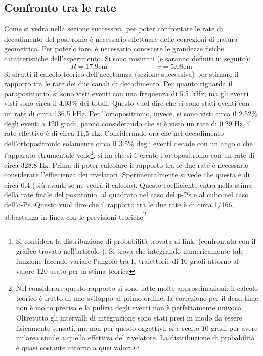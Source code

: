 \subsection{Confronto tra le rate}
Come si vedrà nella sezione successiva, per poter confrontare le rate di decadimento del positronio è necessario effettuare delle correzioni di natura geometrica. Per poterlo
fare, è necessario conoscere le grandezze fisiche caratteristiche dell'esperimento. Si sono misurati (e saranno definiti in seguito):
$$R = 17.9 \text{cm} \hspace{3cm} r =5.08 \text{cm}$$
Si sfrutti il calcolo teorico dell'accettanza (sezione successiva) per stimare il rapporto tra le rate dei due canali di decadimento. Per quanto riguarda il parapositronio, si sono visti eventi con una frequenza di 5.5~kHz, ma gli eventi visti sono circa il 4.03\% dei totali. Questo vuol dire che 
ci sono stati eventi con un rate di circa 136.5 kHz. Per l'ortopositronio, invece, si sono visti circa il 2.52\% degli eventi a 120 gradi,
perciò considerando che si è visto un rate
di 0.29 Hz, il rate effettivo è di circa 11,5 Hz. Considerando ora che nel decadimento dell'ortopositronio solamente circa il 3.5\% degli eventi decade con un
angolo che l'apparato strumentale vede\footnote{Si considera la distribuzione di probabilità trovata al link:
\cite{bib:pos_formula} (confrontata con il grafico trovato nell'articolo \cite{bib:pos_graph}).
Si trova che integrando numericamente tale funzione facendo variare l'angolo tra le traiettorie di 10 gradi attorno al valore 120 usato per la stima teorica},
si ha che si è creato l'ortopositronio con un rate di circa 328.8 Hz. Prima di poter calcolare il rapporto tra le due rate è necessario considerare l'effiecienza dei rivelatori. Sperimentalmente si vede che questa è di circa 0.4 (più avanti se ne vedrà il calcolo). Questo coefficiente entra nella stima della rate finale del positronio, al quadrato nel caso del p-Ps e al cubo nel caso dell'o-Ps. Questo vuol dire che il rapporto tra le due rate è di circa 1/166, abbastanza in linea con le previsioni teoriche\footnote{Nel considerare questo rapporto si sono fatte molte approssimazioni: il calcolo teorico è frutto di uno sviluppo al primo ordine, la correzione per il
dead time non è molto precisa e la pulizia degli eventi non è perfettamente univoca. Oltretutto gli intervalli di integrazione sono stati presi in modo da essere fisicamente
sensati, ma non per questo oggettivi, si è scelto 10 gradi per avere un'area simile a quella effettiva del rivelatore. La distribuzione di probabilità è quasi costante
attorno a quei valori.}\\


